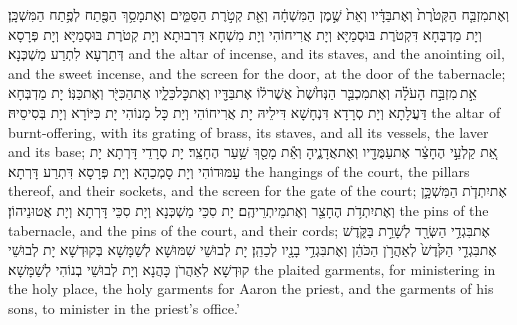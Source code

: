 {וְאֶת\maqqaf מִזְבַּ֤ח הַקְּטֹ֙רֶת֙ וְאֶת\maqqaf בַּדָּ֔יו וְאֵת֙ שֶׁ֣מֶן הַמִּשְׁחָ֔ה וְאֵ֖ת קְטֹ֣רֶת הַסַּמִּ֑ים וְאֶת\maqqaf מָסַ֥ךְ הַפֶּ֖תַח לְפֶ֥תַח הַמִּשְׁכָּֽן׃}
{וְיָת מַדְבְּחָא דִּקְטֹרֶת בּוּסְמַיָּא וְיָת אֲרִיחוֹהִי וְיָת מִשְׁחָא דִּרְבוּתָא וְיָת קְטֹרֶת בּוּסְמַיָּא וְיָת פְּרָסָא דְּתַרְעָא לִתְרַע מַשְׁכְּנָא׃}
{and the altar of incense, and its staves, and the anointing oil, and the sweet incense, and the screen for the door, at the door of the tabernacle;}{}
{אֵ֣ת \legarmeh  מִזְבַּ֣ח הָעֹלָ֗ה וְאֶת\maqqaf מִכְבַּ֤ר הַנְּחֹ֙שֶׁת֙ אֲשֶׁר\maqqaf ל֔וֹ אֶת\maqqaf בַּדָּ֖יו וְאֶת\maqqaf כׇּל\maqqaf כֵּלָ֑יו אֶת\maqqaf הַכִּיֹּ֖ר וְאֶת\maqqaf כַּנּֽוֹ׃}
{יָת מַדְבְּחָא דַּעֲלָתָא וְיָת סְרָדָא דִּנְחָשָׁא דִּילֵיהּ יָת אֲרִיחוֹהִי וְיָת כָּל מָנוֹהִי יָת כִּיּוֹרָא וְיָת בְּסִיסֵיהּ׃}
{the altar of burnt-offering, with its grating of brass, its staves, and all its vessels, the laver and its base;}{}
{אֵ֚ת קַלְעֵ֣י הֶחָצֵ֔ר אֶת\maqqaf עַמֻּדָ֖יו וְאֶת\maqqaf אֲדָנֶ֑יהָ וְאֵ֕ת מָסַ֖ךְ שַׁ֥עַר הֶחָצֵֽר׃}
{יָת סְרָדֵי דָּרְתָא יָת עַמּוּדוֹהִי וְיָת סָמְכַהָא וְיָת פְּרָסָא דִּתְרַע דָּרְתָא׃}
{the hangings of the court, the pillars thereof, and their sockets, and the screen for the gate of the court;}{}
{אֶת\maqqaf יִתְדֹ֧ת הַמִּשְׁכָּ֛ן וְאֶת\maqqaf יִתְדֹ֥ת הֶחָצֵ֖ר וְאֶת\maqqaf מֵיתְרֵיהֶֽם׃}
{יָת סִכֵּי מַשְׁכְּנָא וְיָת סִכֵּי דָּרְתָא וְיָת אֲטוּנֵיהוֹן׃}
{the pins of the tabernacle, and the pins of the court, and their cords;}{}
{אֶת\maqqaf בִּגְדֵ֥י הַשְּׂרָ֖ד לְשָׁרֵ֣ת בַּקֹּ֑דֶשׁ אֶת\maqqaf בִּגְדֵ֤י הַקֹּ֙דֶשׁ֙ לְאַהֲרֹ֣ן הַכֹּהֵ֔ן וְאֶת\maqqaf בִּגְדֵ֥י בָנָ֖יו לְכַהֵֽן׃}
{יָת לְבוּשֵׁי שִׁמּוּשָׁא לְשַׁמָּשָׁא בְּקוּדְשָׁא יָת לְבוּשֵׁי קוּדְשָׁא לְאַהֲרֹן כָּהֲנָא וְיָת לְבוּשֵׁי בְנוֹהִי לְשַׁמָּשָׁא׃}
{the plaited garments, for ministering in the holy place, the holy garments for Aaron the priest, and the garments of his sons, to minister in the priest’s office.’}{}
